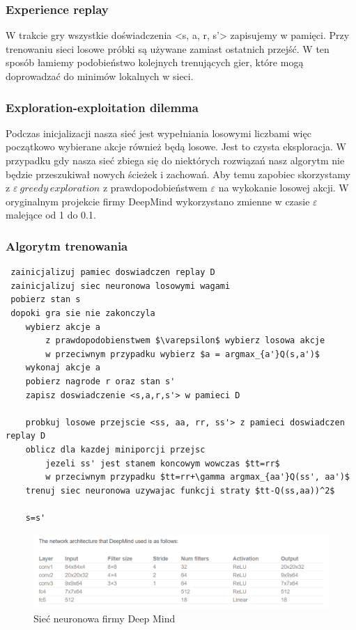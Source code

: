 \documentclass[12pt]{article}
\begin{document}
\subsubsection{Experience replay}

W trakcie gry wszystkie doświadczenia <s, a, r, s'> zapisujemy w pamięci. Przy trenowaniu sieci losowe próbki są używane zamiast ostatnich przejść. W ten sposób łamiemy podobieństwo kolejnych trenujących gier, które mogą doprowadzać do minimów lokalnych w sieci.

\subsubsection{Exploration-exploitation dilemma}

Podczas inicjalizacji nasza sieć jest wypełniania losowymi liczbami więc początkowo wybierane akcje również będą losowe. Jest to czysta eksploracja. W przypadku gdy nasza sieć zbiega się do niektórych rozwiązań nasz algorytm nie będzie przeszukiwał nowych ścieżek i zachowań. Aby temu zapobiec skorzystamy z $\varepsilon\ greedy\ exploration$ z prawdopodobieństwem $\varepsilon$ na wykokanie losowej akcji. W oryginalnym projekcie firmy DeepMind wykorzystano zmienne w czasie $\varepsilon$ malejące od 1 do 0.1.

\subsubsection{Algorytm trenowania}

\begin{lstlisting}
 zainicjalizuj pamiec doswiadczen replay D
 zainicjalizuj siec neuronowa losowymi wagami
 pobierz stan s
 dopoki gra sie nie zakonczyla
	wybierz akcje a
		z prawdopodobienstwem $\varepsilon$ wybierz losowa akcje
		w przeciwnym przypadku wybierz $a = argmax_{a'}Q(s,a')$
	wykonaj akcje a
	pobierz nagrode r oraz stan s'
	zapisz doswiadczenie <s,a,r,s'> w pamieci D
	
	probkuj losowe przejscie <ss, aa, rr, ss'> z pamieci doswiadczen replay D
	oblicz dla kazdej miniporcji przejsc
		jezeli ss' jest stanem koncowym wowczas $tt=rr$
		w przeciwnym przypadku $tt=rr+\gamma argmax_{aa'}Q(ss', aa')$
	trenuj siec neuronowa uzywajac funkcji straty $tt-Q(ss,aa))^2$
	
	s=s'

\end{lstlisting}

\begin{figure}[H]
\centering \includegraphics[scale=0.7]{deep_mind_architecture.PNG}
\caption{Sieć neuronowa firmy Deep Mind}
\label{simple1}
\end{figure}
\end{document}
